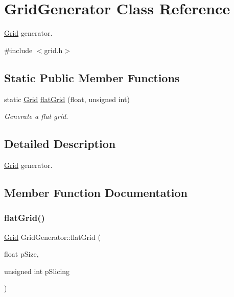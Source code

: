\hypertarget{classGridGenerator}{}\section{Grid\+Generator Class Reference}
\label{classGridGenerator}


\hyperlink{classGrid}{Grid} generator.  




{\ttfamily \#include $<$grid.\+h$>$}

\subsection*{Static Public Member Functions}
\begin{DoxyCompactItemize}
\item 
static \hyperlink{classGrid}{Grid} \hyperlink{classGridGenerator_a1d24c94f5c4468e34b6dfed8bff1fe5c}{flat\+Grid} (float, unsigned int)
\begin{DoxyCompactList}\small\item\em Generate a flat grid. \end{DoxyCompactList}\end{DoxyCompactItemize}


\subsection{Detailed Description}
\hyperlink{classGrid}{Grid} generator. 

\subsection{Member Function Documentation}
\mbox{\label{classGridGenerator_a1d24c94f5c4468e34b6dfed8bff1fe5c}} 
\subsubsection{\texorpdfstring{flat\+Grid()}{flatGrid()}}
{\footnotesize\ttfamily \hyperlink{classGrid}{Grid} Grid\+Generator\+::flat\+Grid (\begin{DoxyParamCaption}\item[{float}]{p\+Size,  }\item[{unsigned int}]{p\+Slicing }\end{DoxyParamCaption})\hspace{0.3cm}{\ttfamily [static]}}



